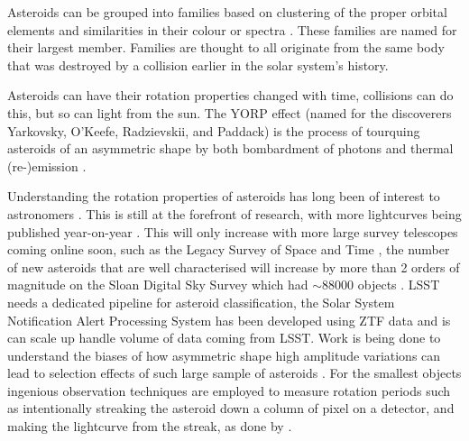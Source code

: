 \documentclass{UCreport}
\begin{document}

Asteroids can be grouped into families based on clustering of the proper orbital elements and similarities in their colour or spectra \citep{Nesvorny2015}.
These families are named for their largest member.
Families are thought to all originate from the same body that was destroyed by a collision earlier in the solar system's history.

Asteroids can have their rotation properties changed with time, collisions can do this, but so can light from the sun.
The YORP effect (named for the discoverers Yarkovsky, O'Keefe, Radzievskii, and Paddack) is the process of tourquing asteroids of an asymmetric shape by both bombardment of photons and thermal (re-)emission \citep{Rubincam2000}.

Understanding the rotation properties of asteroids has long been of interest to astronomers \citep[e.g.][for early work into the limits of rotation period and the tumbling nature of some small bodies]{Weidenschilling1981,Harris1994}.
This is still at the forefront of research, with more lightcurves being published year-on-year \citep{Harris2015}.
This will only increase with more large survey telescopes coming online soon, such as the Legacy Survey of Space and Time \citep[LSST][]{LSST2019}, the number of new asteroids that are well characterised will increase by more than 2 orders of magnitude on the Sloan Digital Sky Survey \citep[SDSS][]{York2000} which had $\sim 88000$ objects \citet{Parker2008}.
LSST needs a dedicated pipeline for asteroid classification, the Solar System Notification Alert Processing System \citep[SNAPS][]{Trilling2023} has been developed using ZTF data and is can scale up handle volume of data coming from LSST.
Work is being done to understand the biases of how  asymmetric shape high amplitude variations can lead to selection effects of such large sample of asteroids \citet{Levine2023}.
For the smallest objects ingenious observation techniques are employed to measure rotation periods such as intentionally streaking the asteroid down a column of pixel on a detector, and making the lightcurve from the streak, as done by \citet{Bolin2023}.
\end{document}
